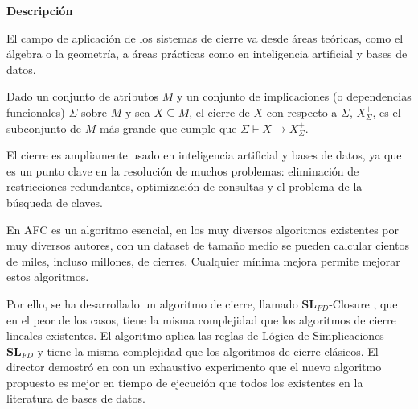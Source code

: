 \textbf{Descripci\'on} 



El campo de aplicaci\'on de los sistemas de cierre va desde \'areas te\'oricas, como el \'algebra o la geometr\'ia, a \'areas pr\'acticas como en inteligencia artificial y bases de datos.

Dado un conjunto de atributos \( M \) y un conjunto de implicaciones (o dependencias funcionales) \( \Sigma \) sobre \( M \) y sea \( X \subseteq M \), el cierre de \( X \) con respecto a \( \Sigma \), \( X^+_{\Sigma} \), es el subconjunto de \( M \) m\'as grande que cumple que \( \Sigma \vdash X \to X^+_{\Sigma} \).

El cierre es ampliamente usado en inteligencia artificial y bases de datos, ya que es un punto clave en la resoluci\'on de muchos problemas: eliminaci\'on de restricciones redundantes, optimizaci\'on de consultas y el problema de la b\'usqueda de claves.

En AFC es un algoritmo esencial, en los muy diversos algoritmos existentes por muy diversos autores, con un dataset de tama\~no medio se pueden calcular cientos de miles, incluso millones, de cierres. Cualquier m\'inima mejora permite mejorar estos algoritmos. 

Por ello, se ha desarrollado un algoritmo de cierre, llamado \(\textbf{SL}_{FD}\)-Closure \cite{Mora2012a}, que en el peor de los casos, tiene la misma complejidad que los algoritmos de cierre lineales existentes.
El algoritmo aplica las reglas de L\'ogica de Simplicaciones \(\textbf{SL}_{FD}\) \cite{Cordero2002} y tiene la misma complejidad que los algoritmos de cierre cl\'asicos. El director demostr\'o en \cite{Mora2012a} con un exhaustivo experimento que el nuevo algoritmo propuesto es mejor en tiempo de ejecuci\'on que todos los existentes en la literatura de bases de datos. \\

